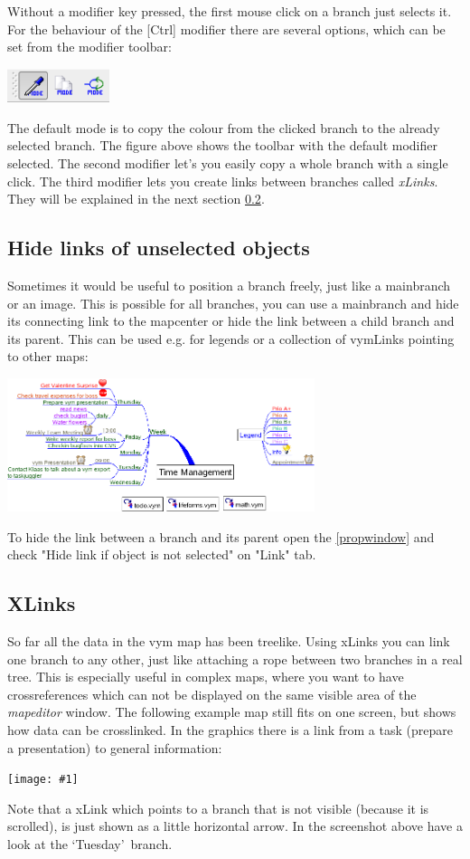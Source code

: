 \documentclass[12pt,a4paper]{article}
\newcommand{\maximage}[1]{  
    \begin{center}
        \texttt{[image: \#1]} 
    \end{center}
}
\newcommand{\vym}{{\sc vym }}
\newcommand{\key}[1]{[#1]}
\begin{document}
Without a modifier key pressed, the first mouse click on a branch just selects
it. For the behaviour of the \key{Ctrl} modifier there are several
options, which can be set from the modifier toolbar:
\begin{center}
    \includegraphics[width=3cm]{images/modmodes.png}
\end{center}
The default mode is to copy the colour from the clicked branch to the
already selected branch. The figure above shows the toolbar with the
default modifier selected. The second modifier let's you easily copy a
whole branch with a single click. The third modifier lets you create
links between branches called {\em xLinks}.  They will be explained in
the next section \ref{xlinks}.

\subsection{Hide links of unselected objects} \label{hidelink}
Sometimes it would be useful to position a branch freely, just like a
mainbranch or an image. This is possible for all branches, you can use a
mainbranch and hide its connecting link to the mapcenter or hide the
link between a child branch and its parent. This can be used e.g. for
legends or a collection of vymLinks pointing to other maps:
\begin{center}
    \includegraphics[width=9cm]{images/hiddenlink.png}
\end{center}
To hide the link between a branch and its parent open the
\ref{propwindow} and check "Hide link if object is not selected" on
"Link" tab.


\subsection{XLinks} \label{xlinks}
So far all the data in the \vym map has been treelike. Using xLinks you
can link one branch to any other, just like attaching a rope between two
branches in a real tree. This is especially useful in complex maps,
where you want to have crossreferences which can not be displayed on the
same visible area of the {\em mapeditor} window. The following example
map still fits on one screen, but shows how data can be crosslinked. In
the graphics there is a link from a task (prepare a presentation) to
general information: \maximage{images/xlink.png}
Note that a xLink which points to a branch that is not visible (because
it is scrolled), is just shown as a little horizontal arrow. In the
screenshot above have a look at the \lq Tuesday\rq\ branch.
\end{document}
